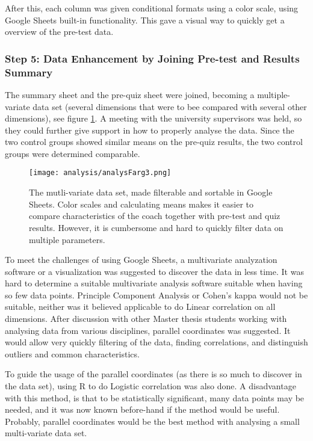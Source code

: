 After this, each column was given conditional formats using a color scale, using Google Sheets built-in functionality. This gave a visual way to quickly get a overview of the pre-test data.

\subsubsection{Step 5: Data Enhancement by Joining Pre-test and Results Summary}

The summary sheet and the pre-quiz sheet were joined, becoming a multiple-variate data set (several dimensions that were to bee compared with several other dimensions), see figure \ref{fig:analysFarg3}. A meeting with the university supervisors was held, so they could further give support in how to properly analyse the data. Since the two control groups showed similar means on the pre-quiz results, the two control groups were determined comparable.

\begin{figure}[h]
    \centering
    \texttt{[image: analysis/analysFarg3.png]}
    \caption{The mutli-variate data set, made filterable and sortable in Google Sheets. Color scales and calculating means makes it easier to compare characteristics of the coach together with pre-test and quiz results. However, it is cumbersome and hard to quickly filter data on multiple parameters.}
    \label{fig:analysFarg3}
\end{figure}

To meet the challenges of using Google Sheets, a multivariate analyzation software or a visualization was suggested to discover the data in less time. It was hard to determine a suitable multivariate analysis software suitable when having so few data points. Principle Component Analysis or Cohen's kappa would not be suitable, neither was it believed applicable to do Linear correlation on all dimensions. After discussion with other Master thesis students working with analysing data from various disciplines, parallel coordinates was suggested. It would allow very quickly filtering of the data, finding correlations, and distinguish outliers and common characteristics.

To guide the usage of the parallel coordinates (as there is so much to discover in the data set), using R to do Logistic correlation was also done. A disadvantage with this method, is that to be statistically significant, many data points may be needed, and it was now known before-hand if the method would be useful. Probably, parallel coordinates would be the best method with analysing a small multi-variate data set.

